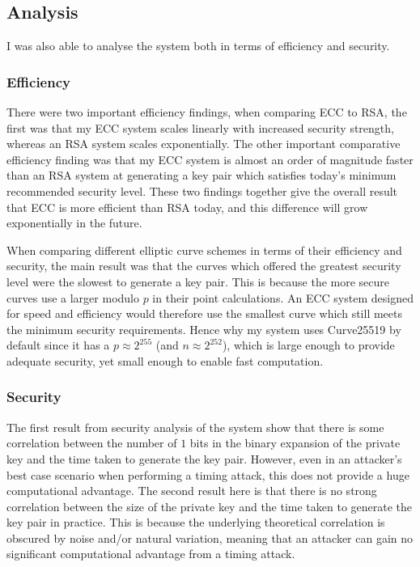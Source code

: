 \documentclass[12pt,a4paper]{article}
\begin{document}
\subsection{Analysis} \noindent
I was also able to analyse the system both in terms of efficiency and security. 

\subsubsection{Efficiency} \noindent
There were two important efficiency findings, when comparing ECC to RSA, 
the first was that my ECC system scales linearly with increased security strength, 
whereas an RSA system scales exponentially. 
The other important comparative efficiency finding was that my ECC system is almost an order of magnitude faster than an RSA system at generating a key pair which satisfies today's minimum recommended security level. 
These two findings together give the overall result that ECC is more efficient than RSA today, 
and this difference will grow exponentially in the future. 

When comparing different elliptic curve schemes in terms of their efficiency and security, 
the main result was that the curves which offered the greatest security level were the slowest to generate a key pair. 
This is because the more secure curves use a larger modulo $p$ in their point calculations. 
An ECC system designed for speed and efficiency would therefore use the smallest curve which still meets the minimum security requirements. 
Hence why my system uses Curve25519 by default since it has a $p \approx 2^{255}$ (and $n \approx 2^{252}$), 
which is large enough to provide adequate security, yet small enough to enable fast computation. 

\subsubsection{Security} \noindent
The first result from security analysis of the system show that there is some correlation between the number of $1$ bits in the binary expansion of the private key and the time taken to generate the key pair. 
However, even in an attacker's best case scenario when performing a timing attack, 
this does not provide a huge computational advantage. 
The second result here is that there is no strong correlation between the size of the private key and the time taken to generate the key pair in practice. 
This is because the underlying theoretical correlation is obscured by noise and/or natural variation, 
meaning that an attacker can gain no significant computational advantage from a timing attack. 
\end{document}
